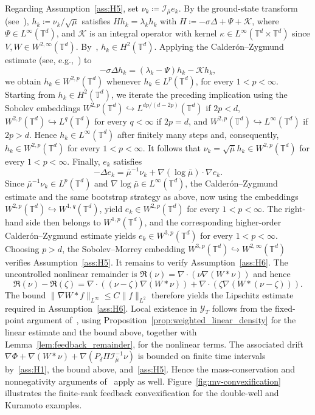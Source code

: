 \documentclass[11pt]{article}
\numberwithin{equation}{section}
\theoremstyle{definition}
\newcommand{\T}{\mathbb{T}}
\newcommand{\rieszmap}[1][\mu]{\mathcal{I}_{#1}}
\begin{document}
Regarding Assumption~\ref{ass:H5}, set $\nu_k \coloneqq \rieszmap[\bar\mu]e_k$.
By the ground-state transform (see~\cite{KaliseMoschenPavliotis2025}), $h_k \coloneqq \nu_k / \sqrt{\bar\mu}$ satisfies $H h_k = \lambda_k h_k$ with $H \coloneqq -\sigma \Delta + \Psi + \mathcal{K}$, where $\Psi \in L^\infty(\T^d)$, and $\mathcal{K}$ is an integral operator with kernel $\kappa \in L^\infty(\T^d \times \T^d)$ since $V, W \in W^{2,\infty}(\T^d)$.
By~\cite[Proposition~2.10]{KaliseMoschenPavliotis2025}, $h_k \in H^2(\T^d)$.
Applying the Calderón--Zygmund estimate (see, e.g.,~\cite[Thm. 9.11]{gilbarg2015elliptic}) to
\begin{equation}
    \label{eq:eigenfunction-elliptic-regularity}
    -\sigma \Delta h_k = (\lambda_k - \Psi)h_k - \mathcal{K}h_k,
\end{equation}
we obtain $h_k \in W^{2,p}(\T^d)$ whenever $h_k \in L^p(\T^d)$, for every $1 < p < \infty$.
Starting from $h_k \in H^2(\T^d)$, we iterate the preceding implication using the Sobolev embeddings $W^{2,p}(\T^d)\hookrightarrow L^{dp/(d-2p)}(\T^d)$ if $2p < d$, $W^{2,p}(\T^d) \hookrightarrow L^q(\T^d)$ for every $q < \infty$ if $2p = d$, and $W^{2,p}(\T^d) \hookrightarrow L^\infty(\T^d)$ if $2p > d$.
Hence $h_k \in L^\infty(\T^d)$ after finitely many steps and, consequently, $h_k \in W^{2,p}(\T^d)$ for every $1 < p < \infty$.
It follows that $\nu_k = \sqrt{\bar\mu} h_k \in W^{2,p}(\T^d)$ for every $1 < p <\infty$.
Finally, $e_k$ satisfies
\[
-\Delta e_k = \bar\mu^{-1}\nu_k + \nabla(\log\bar\mu) \cdot \nabla e_k.
\]
Since $\bar\mu^{-1} \nu_k \in L^{p}(\T^d)$ and $\nabla \log\bar\mu \in L^{\infty}(\T^d)$, the Calderón--Zygmund estimate and the same bootstrap strategy as above, now using the embeddings $W^{2,p}(\T^d) \hookrightarrow W^{1,q}(\T^d)$, yield $e_k \in W^{2,p}(\T^d)$ for every $1 < p < \infty$. 
The right-hand side then belongs to $W^{1,p}(\T^d)$, and the corresponding higher-order Calderón--Zygmund estimate yields $e_k \in W^{3,p}(\T^d)$ for every $1 < p < \infty$.
Choosing $p > d$, the Sobolev--Morrey embedding $W^{3,p}(\T^d) \hookrightarrow W^{2,\infty}(\T^d)$ verifies Assumption~\ref{ass:H5}.
It remains to verify Assumption~\ref{ass:H6}.
The uncontrolled nonlinear remainder is $\mathfrak{R}(\nu) = \nabla \cdot (\nu \nabla (W * \nu))$ and hence
\[
\mathfrak{R}(\nu) - \mathfrak{R}(\zeta) = \nabla \cdot ((\nu-\zeta) \nabla (W * \nu)) + \nabla \cdot (\zeta \nabla (W*(\nu-\zeta))).
\]
The bound $\|\nabla W * f\|_{L^\infty} \le C\|f\|_{L^2}$ therefore yields the Lipschitz estimate required in Assumption~\ref{ass:H6}.
Local existence in $\mathcal{Y}_T$ follows from the fixed-point argument of~\cite[Section~3.4]{KaliseMoschenPavliotis2025}, using Proposition~\ref{prop:weighted_linear_density} for the linear estimate and the bound above, together with Lemma~\ref{lem:feedback_remainder}, for the nonlinear terms.
The associated drift $\nabla\Phi + \nabla(W * \nu) + \nabla(P_\delta \Pi \rieszmap[\bar\mu]^{-1} \nu)$ is bounded on finite time intervals by~\ref{ass:H1}, the bound above, and~\ref{ass:H5}.
Hence the mass-conservation and nonnegativity arguments of~\cite[Appendix~B]{KaliseMoschenPavliotis2025} apply as well.
Figure~\ref{fig:mv-convexification} illustrates the finite-rank feedback convexification for the double-well and Kuramoto examples.
\end{document}
